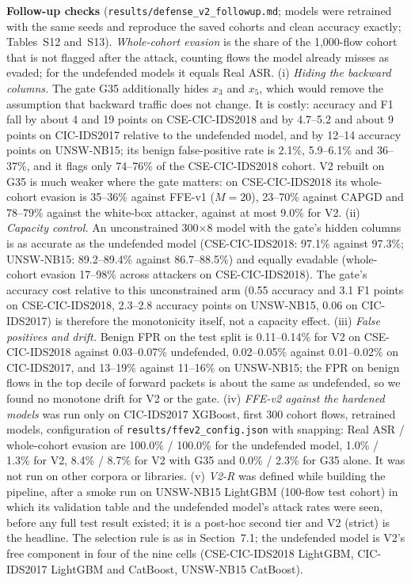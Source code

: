 \textbf{Follow-up checks} (\texttt{results/defense\_v2\_followup.md}; models were retrained with the same seeds and reproduce the saved cohorts and clean accuracy exactly; Tables~S12 and~S13). \emph{Whole-cohort evasion} is the share of the 1,000-flow cohort that is not flagged after the attack, counting flows the model already misses as evaded; for the undefended models it equals Real ASR. (i) \emph{Hiding the backward columns.} The gate G35 additionally hides $x_3$ and $x_5$, which would remove the assumption that backward traffic does not change. It is costly: accuracy and F1 fall by about 4 and 19 points on CSE-CIC-IDS2018 and by 4.7--5.2 and about 9 points on CIC-IDS2017 relative to the undefended model, and by 12--14 accuracy points on UNSW-NB15; its benign false-positive rate is 2.1\%, 5.9--6.1\% and 36--37\%, and it flags only 74--76\% of the CSE-CIC-IDS2018 cohort. V2 rebuilt on G35 is much weaker where the gate matters: on CSE-CIC-IDS2018 its whole-cohort evasion is 35--36\% against FFE-v1 ($M=20$), 23--70\% against CAPGD and 78--79\% against the white-box attacker, against at most 9.0\% for V2. (ii) \emph{Capacity control.} An unconstrained 300$\times$8 model with the gate's hidden columns is as accurate as the undefended model (CSE-CIC-IDS2018: 97.1\% against 97.3\%; UNSW-NB15: 89.2--89.4\% against 86.7--88.5\%) and equally evadable (whole-cohort evasion 17--98\% across attackers on CSE-CIC-IDS2018). The gate's accuracy cost relative to this unconstrained arm (0.55 accuracy and 3.1 F1 points on CSE-CIC-IDS2018, 2.3--2.8 accuracy points on UNSW-NB15, 0.06 on CIC-IDS2017) is therefore the monotonicity itself, not a capacity effect. (iii) \emph{False positives and drift.} Benign FPR on the test split is 0.11--0.14\% for V2 on CSE-CIC-IDS2018 against 0.03--0.07\% undefended, 0.02--0.05\% against 0.01--0.02\% on CIC-IDS2017, and 13--19\% against 11--16\% on UNSW-NB15; the FPR on benign flows in the top decile of forward packets is about the same as undefended, so we found no monotone drift for V2 or the gate. (iv) \emph{FFE-v2 against the hardened models} was run only on CIC-IDS2017 XGBoost, first 300 cohort flows, retrained models, configuration of \texttt{results/ffev2\_config.json} with snapping: Real ASR / whole-cohort evasion are 100.0\% / 100.0\% for the undefended model, 1.0\% / 1.3\% for V2, 8.4\% / 8.7\% for V2 with G35 and 0.0\% / 2.3\% for G35 alone. It was not run on other corpora or libraries. (v) \emph{V2-R} was defined while building the pipeline, after a smoke run on UNSW-NB15 LightGBM (100-flow test cohort) in which its validation table and the undefended model's attack rates were seen, before any full test result existed; it is a post-hoc second tier and V2 (strict) is the headline. The selection rule is as in Section~7.1; the undefended model is V2's free component in four of the nine cells (CSE-CIC-IDS2018 LightGBM, CIC-IDS2017 LightGBM and CatBoost, UNSW-NB15 CatBoost).

